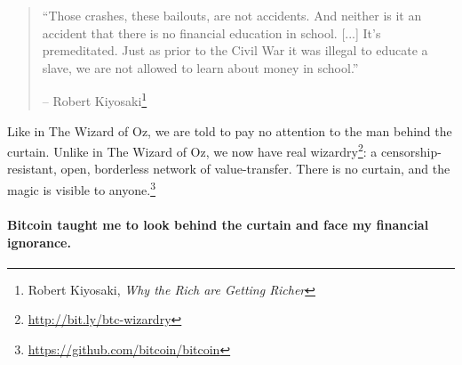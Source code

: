 \begin{quotation}\begin{samepage}
\enquote{Those crashes, these bailouts, are not accidents. And neither is it an
accident that there is no financial education in school. [...] It's
premeditated. Just as prior to the Civil War it was illegal to educate a slave,
we are not allowed to learn about money in school.}
\begin{flushright} -- Robert Kiyosaki\footnote{Robert Kiyosaki, \textit{Why the Rich
are Getting Richer}\cite{robert-kiyosaki}}
\end{flushright}\end{samepage}\end{quotation}

Like in The Wizard of Oz, we are told to pay no attention to the man behind the
curtain. Unlike in The Wizard of Oz, we now have real
wizardry\footnote{\url{http://bit.ly/btc-wizardry}}: a censorship-resistant,
open, borderless network of value-transfer. There is no curtain, and the magic
is visible to anyone.\footnote{\url{https://github.com/bitcoin/bitcoin}}

\paragraph{Bitcoin taught me to look behind the curtain and face my financial
ignorance.}

%
%
%
%
